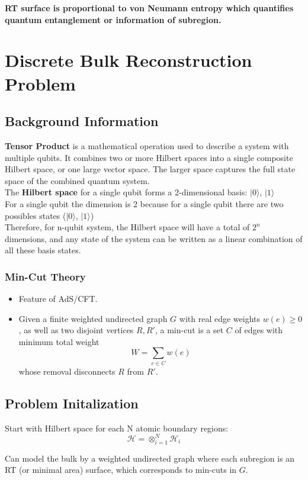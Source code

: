 \documentclass[12pt]{article}
\begin{document}
    \textbf{RT surface is proportional to von Neumann entropy which quantifies quantum entanglement or information of subregion.}

\section{Discrete Bulk Reconstruction Problem}
\subsection{Background Information}
\textbf{Tensor Product} is a mathematical operation used to describe a system with multiple qubits. It combines two or more Hilbert spaces into a single composite Hilbert space, or one large vector space. The larger space captures the full state space of the combined quantum system.
\\
The \textbf{Hilbert space} for a single qubit forms a 2-dimensional basis: $|0\rangle$, $|1\rangle$
\\ For a single qubit the dimension is 2 because for a single qubit there are two possibles states ($|0\rangle$, $|1\rangle$)
\\ Therefore, for n-qubit system, the Hilbert space will have a total of $2^n$ dimensions, and any state of the system can be written as a linear combination of all these basis states.
\subsubsection{Min-Cut Theory}
\begin{itemize}
    \item Feature of AdS/CFT.
    \item Given a finite weighted undirected graph \( G \) with real edge weights \( w(e) \geq 0 \), as well as two disjoint vertices \( R, R' \), a min-cut is a set \( C \) of edges with minimum total weight
    \[
    W = \sum_{e \in C} w(e)
    \]
    whose removal disconnects \( R \) from \( R' \).
\end{itemize}

\subsection{Problem Initalization}
Start with Hilbert space for each N atomic boundary regions:
\[
\mathcal{H} = \otimes^{N}_{i=1}\mathcal{H}_{i}
\]

Can model the bulk by a weighted undirected graph where each subregion is an RT (or minimal area) surface, which corresponds to min-cuts in \( G \).
\end{document}
